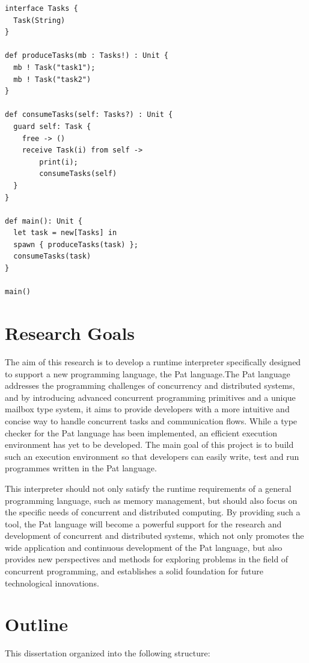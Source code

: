 \documentclass{l4proj}
\begin{document}
\noindent\begin{minipage}{\linewidth}
\lstset{style=patstyle}
\begin{lstlisting}[caption=Pat Language Example, label={lst:patexample1}]
interface Tasks {
  Task(String)
}

def produceTasks(mb : Tasks!) : Unit {
  mb ! Task("task1");
  mb ! Task("task2")
}

def consumeTasks(self: Tasks?) : Unit {
  guard self: Task {
    free -> ()
    receive Task(i) from self ->
        print(i);
        consumeTasks(self)
  }
}

def main(): Unit {
  let task = new[Tasks] in
  spawn { produceTasks(task) };
  consumeTasks(task)
}

main()
\end{lstlisting}
\end{minipage}

\section{Research Goals}

The aim of this research is to develop a runtime interpreter specifically designed to support a new programming language, the Pat language.The Pat language addresses the programming challenges of concurrency and distributed systems, and by introducing advanced concurrent programming primitives and a unique mailbox type system, it aims to provide developers with a more intuitive and concise way to handle concurrent tasks and communication flows. While a type checker for the Pat language has been implemented, an efficient execution environment has yet to be developed. The main goal of this project is to build such an execution environment so that developers can easily write, test and run programmes written in the Pat language.

This interpreter should not only satisfy the runtime requirements of a general programming language, such as memory management, but should also focus on the specific needs of concurrent and distributed computing. By providing such a tool, the Pat language will become a powerful support for the research and development of concurrent and distributed systems, which not only promotes the wide application and continuous development of the Pat language, but also provides new perspectives and methods for exploring problems in the field of concurrent programming, and establishes a solid foundation for future technological innovations.

\section{Outline}
This dissertation organized into the following structure:
\end{document}
